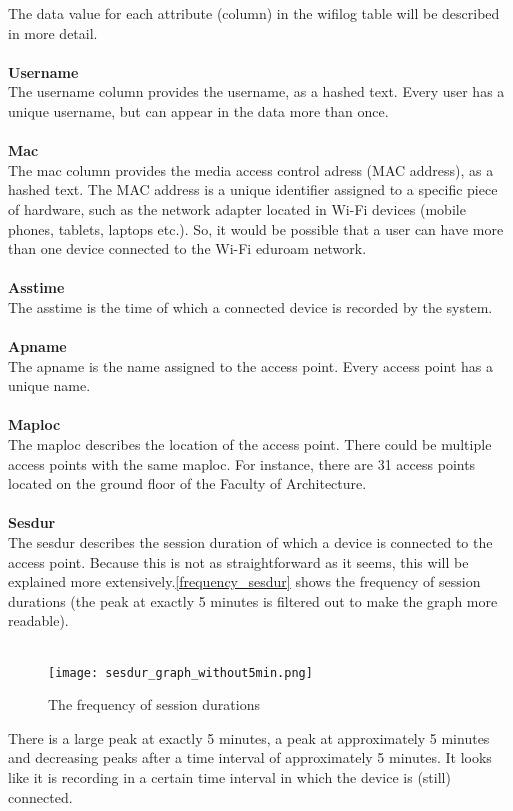 The data value for each attribute (column) in the wifilog table will be described in more detail.\\\\
\textbf{Username}\\
The username column provides the username, as a hashed text. Every user has a unique username, but can appear in the data more than once.
\\\\
\textbf{Mac}\\
The mac column provides the media access control adress (MAC address), as a hashed text. The MAC address is a unique identifier assigned to a specific piece of hardware, such as the network adapter located in Wi-Fi devices (mobile phones, tablets, laptops etc.). So, it would be possible that a user can have more than one device connected to the Wi-Fi eduroam network.
\\\\
\textbf{Asstime}\\
The asstime is the time of which a connected device is recorded by the system.
\\\\
\textbf{Apname}\\
The apname is the name assigned to the access point. Every access point has a unique name. 
\\\\
\textbf{Maploc}\\
The maploc describes the location of the access point. There could be multiple access points with the same maploc. For instance, there are 31 access points located on the ground floor of the Faculty of Architecture.
\\\\
\textbf{Sesdur}\\
The sesdur describes the session duration of which a device is connected to the access point. Because this is not as straightforward as it seems, this will be explained more extensively.\autoref{frequency_sesdur} shows the frequency of session durations (the peak at exactly 5 minutes is filtered out to make the graph more readable).\\\\
\begin{figure}[H]
	\centering
	\texttt{[image: sesdur\_graph\_without5min.png]}
	\captionsetup{justification=centering}
	\caption{The frequency of session durations}
	\label{frequency_sesdur}
\end{figure}
There is a large peak at exactly 5 minutes, a peak at approximately 5 minutes and decreasing peaks after a time interval of approximately 5 minutes. It looks like it is recording in a certain time interval in which the device is (still) connected. \\\\
